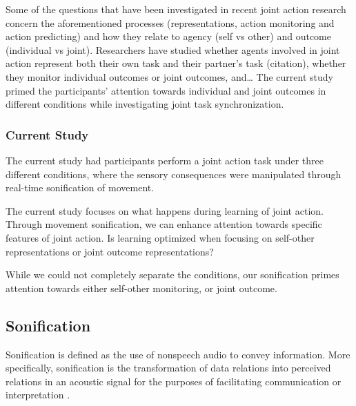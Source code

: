 \documentclass[10pt,a4paper,onecolumn]{article}
\begin{document}
Some of the questions that have been investigated in recent joint action research concern the aforementioned processes (representations, action monitoring and action predicting) and how they relate to agency (self vs other) and outcome (individual vs joint). Researchers have studied whether agents involved in joint action represent both their own task and their partner's task (citation), whether they monitor individual outcomes or joint outcomes, and\ldots{} The current study primed the participants' attention towards individual and joint outcomes in different conditions while investigating joint task synchronization.

\hypertarget{current-study}{%
\subsubsection{Current Study}\label{current-study}}

The current study had participants perform a joint action task under three different conditions, where the sensory consequences were manipulated through real-time sonification of movement.

The current study focuses on what happens during learning of joint action. Through movement sonification, we can enhance attention towards specific features of joint action. Is learning optimized when focusing on self-other representations or joint outcome representations?

While we could not completely separate the conditions, our sonification primes attention towards either self-other monitoring, or joint outcome.

\hypertarget{sonification}{%
\subsection{Sonification}\label{sonification}}

Sonification is defined as the use of nonspeech audio to convey information. More specifically, sonification is the transformation of data relations into perceived relations in an acoustic signal for the purposes of facilitating communication or interpretation \autocite[p.~4]{kramerSonificationReportStatus1999}.
\end{document}

